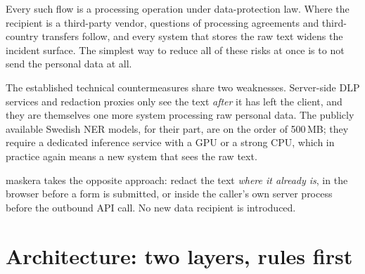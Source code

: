 \documentclass[10pt,a4paper]{article}
\begin{document}
Every such flow is a processing operation under data-protection law. Where the
recipient is a third-party vendor, questions of processing agreements and
third-country transfers follow, and every system that stores the raw text
widens the incident surface. The simplest way to reduce all of these risks at
once is to not send the personal data at all.

The established technical countermeasures share two weaknesses. Server-side
DLP services and redaction proxies only see the text \emph{after} it has left
the client, and they are themselves one more system processing raw personal
data. The publicly available Swedish NER models, for their part, are on the
order of 500\,MB; they require a dedicated inference service with a GPU or a
strong CPU, which in practice again means a new system that sees the raw text.

maskera takes the opposite approach: redact the text \emph{where it already
is}, in the browser before a form is submitted, or inside the caller's own
server process before the outbound API call. No new data recipient is
introduced.

\section{Architecture: two layers, rules first}

\begin{figure}[h]
\centering
{}
\end{figure}
\end{document}

